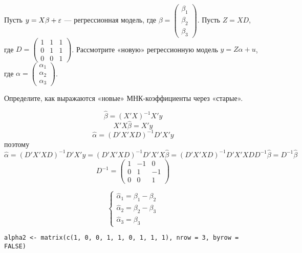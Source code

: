\begin{problem}
Пусть $y = X\beta + \varepsilon$ — регрессионная модель, где $\beta = \begin{pmatrix} \beta_1 \\ \beta_2 \\ \beta_3 \end{pmatrix}$. Пусть $Z = XD$, где $D = \begin{pmatrix} 1 & 1 & 1 \\ 0 & 1 & 1 \\ 0 & 0 & 1 \end{pmatrix}$. Рассмотрите «новую» регрессионную модель $y = Z\alpha + u$, где $\alpha = \begin{pmatrix} \alpha_1 \\ \alpha_2 \\ \alpha_3 \end{pmatrix}$.

Определите, как выражаются «новые» МНК-коэффициенты через «старые».


\begin{sol}
\[\hat\beta=(X'X)^{-1}X'y\]
\[X'X\hat\beta=X'y\]
\[\hat\alpha=(D'X'XD)^{-1}D'X'y\]
поэтому
\[\hat\alpha=(D'X'XD)^{-1}D'X'y=(D'X'XD)^{-1}D'X'X\hat\beta=(D'X'XD)^{-1}D'X'XDD^{-1}\hat\beta=D^{-1}\hat\beta\]
\[D^{-1}=\left(\begin{array}{ccc}
1 & -1 & 0\\
0 & 1 & -1\\
0 & 0 & 1
\end{array}\right)\]

\[\begin{cases}
\hat\alpha_1=\beta_1-\beta_2\\
\hat\alpha_2=\beta_2-\beta_3\\
\hat\alpha_3=\beta_3
\end{cases}\]


\begin{verbatim}
alpha2 <- matrix(c(1, 0, 0, 1, 1, 0, 1, 1, 1), nrow = 3, byrow = FALSE)
\end{verbatim}


\end{sol}
\end{problem}




